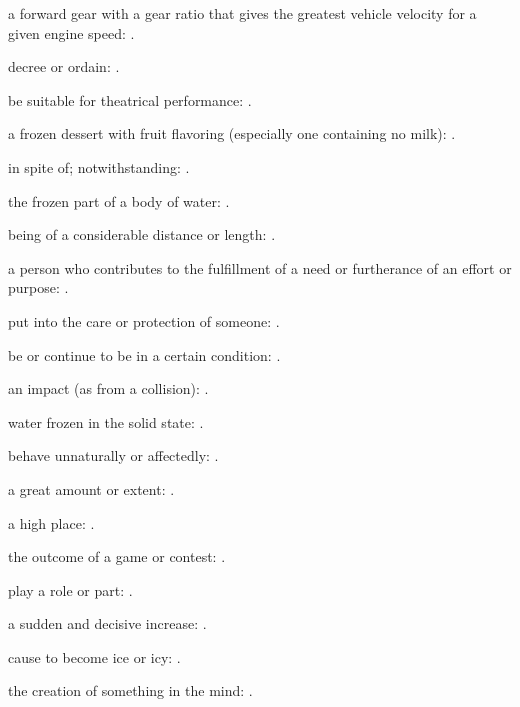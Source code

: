   a forward gear with a gear ratio that gives the greatest vehicle velocity for a given engine speed:   .

  decree or ordain: .

  be suitable for theatrical performance: .

  a frozen dessert with fruit flavoring (especially one containing no milk):   .

  in spite of; notwithstanding: .

  the frozen part of a body of water: .

  being of a considerable distance or length: .

  a person who contributes to the fulfillment of a need or furtherance of an effort or purpose:   .

  put into the care or protection of someone:   .

  be or continue to be in a certain condition: .

  an impact (as from a collision):   .

  water frozen in the solid state:   .

  behave unnaturally or affectedly:   .

  a great amount or extent: .

  a high place:   .

  the outcome of a game or contest: .

  play a role or part:   .

  a sudden and decisive increase:   .

  cause to become ice or icy: .

  the creation of something in the mind:   .

